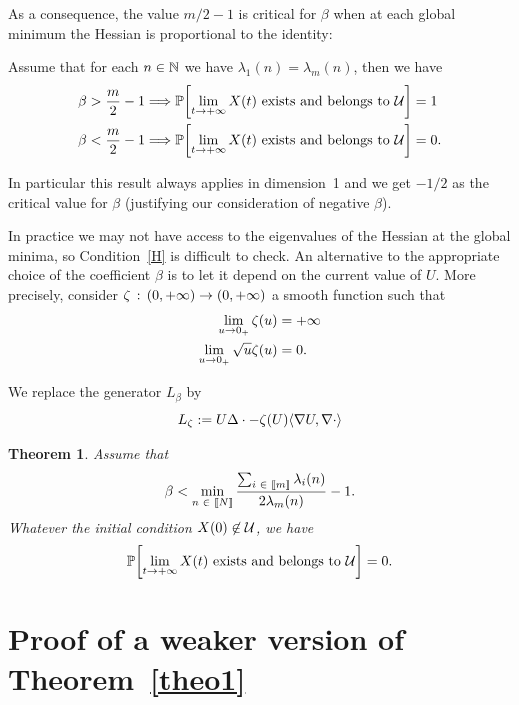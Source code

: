 \documentclass[10pt]{amsart}
\newtheorem{theo}{Theorem}[section]
\theoremstyle{definition}\newtheorem{defi}[theo]{Definition}\newtheorem{rema}[theo]{Remark}\newtheorem{exam}[theo]{Example}\newtheorem{exem}[theo]{Example}\newtheorem{nota}[theo]{Notation}
\newcommand{\f}[2]{\frac{#1}{#2}}
\newcommand{\cU}{\mathcal{U}}
\newcommand{\NN}{\mathbb{N}}
\newcommand{\PP}{\mathbb{P}}
\newcommand{\iy}{\infty}
\newcommand{\na}{\nabla}
\newcommand{\tr}{\Delta}
\let\originalleft\left
\let\originalright\right
\renewcommand{\left}{\mathopen{}\mathclose\bgroup\originalleft}
\renewcommand{\right}{\aftergroup\egroup\originalright}
\let\oldin\in
\renewcommand{\in}{\mathchoice{\oldin}{\oldin}{\,\oldin\,}{\,\oldin\,}}
\renewcommand*{\to}{\mathchoice{\longrightarrow}{\rightarrow}{\rightarrow}{\rightarrow}}
\newcommand*{\RightArrow}{\mathchoice{\Longrightarrow}{\Rightarrow}{\Rightarrow}{\Rightarrow}}
\newcommand{\llbracket}{\mathopen{[\mkern -2.7mu[}}
\newcommand{\rrbracket}{\mathclose{]\mkern -2.7mu]}}
\newcommand{\lin}{\llbracket}
\newcommand{\rin}{\rrbracket}
\begin{document}
As a consequence, the value $m/2-1$ is critical for $\beta$ when at each global minimum the Hessian is proportional to the identity:

\begin{coro}\label{coro}
Assume that for each $n\in\NN$ we have $\lambda_1(n)=\lambda_m(n)$, then we have
\begin{align*}
\beta>\f{m}2-1&\RightArrow \PP\left[\lim_{t\to +\iy} X(t)\text{ exists and belongs to }\cU\right]=1\\
\beta<\f{m}2-1&\RightArrow \PP\left[\lim_{t\to +\iy} X(t)\text{ exists and belongs to }\cU\right]=0.
\end{align*}
\end{coro}


In particular this result always applies in dimension~1 and we get $-1/2$ as the critical value for $\beta$ (justifying our consideration of negative $\beta$).

In practice we may not have access to the eigenvalues of the Hessian at the global minima, so Condition~\eqref{H} is difficult to check. An alternative to the appropriate choice of the coefficient $\beta$ is to let it depend on the current value of $U$. More precisely, consider $\zeta\,:\, (0,+\iy)\to (0,+\iy)$ a smooth function such that
\begin{align}
\lim_{u\to 0_+} \zeta(u)&= +\iy\label{zeta1}\\
\lim_{u\to 0_+} \sqrt{u}\zeta(u)&= 0.\label{zeta2}
\end{align}


We replace the generator $L_\beta$ by
\begin{equation}\label{Lz}
L_\zeta := U \tr \cdot-\zeta(U)\left\langle \na U,\na \cdot\right\rangle
\end{equation}

\begin{theo}\label{theo2}
Assume that
\begin{equation}\label{H2}
\beta < \min_{n\in\lin N\rin}\f{\sum_{i\in\lin m\rin}\lambda_i(n)}{2\lambda_m(n)}-1.
\end{equation}
Whatever the initial condition $X(0)\not\in\cU$, we have
\begin{equation*}
\PP\left[\lim_{t\to+\iy} X(t)\text{ exists and belongs to }\cU\right]= 0.
\end{equation*}
\end{theo}


\section{Proof of a weaker version of Theorem~\ref{theo1}}\label{proof}
\end{document}

